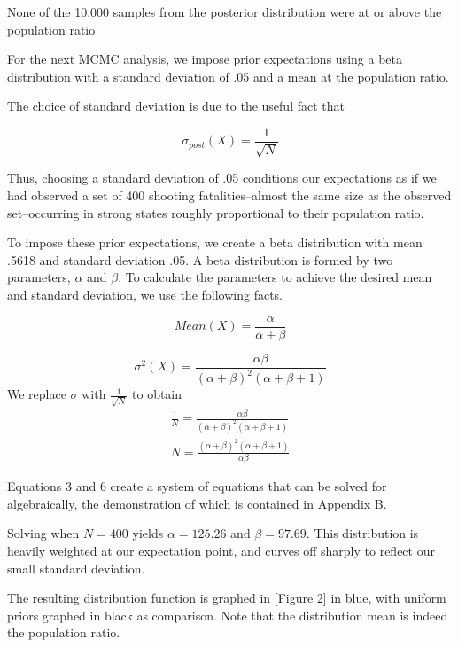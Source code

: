 \documentclass{article}
\begin{document}
None of the 10,000 samples from the posterior distribution were at or above the population ratio

For the next MCMC analysis, we impose prior expectations using a beta distribution with a standard deviation of .05 and a mean at the population ratio. 

The choice of standard deviation is due to the useful fact that

\begin{equation}
\sigma_{post}(X) = \frac{1}{\sqrt{N}}
\end{equation}

Thus, choosing a standard deviation of .05 conditions our expectations as if we had observed a set of 400 shooting fatalities--almost the same size as the observed set--occurring in strong states roughly proportional to their population ratio. 

To impose these prior expectations, we create a beta distribution with mean .5618 and standard deviation .05. A beta distribution is formed by two parameters, $\alpha $ and $\beta$. To calculate the parameters to achieve the desired mean and standard deviation, we use the following facts.

\begin{equation}
Mean(X) = \frac{\alpha}{\alpha + \beta}
\end{equation}

\begin{equation}
\sigma^2(X) = \frac{\alpha \beta}{(\alpha + \beta)^2 (\alpha + \beta +1)}
\end{equation}
We replace $\sigma$ with $\frac{1}{\sqrt{N}}$ to obtain
\begin{align}
\frac{1}{N} = \frac{\alpha \beta}{(\alpha + \beta)^2 (\alpha + \beta +1)}\\
N = \frac{(\alpha + \beta)^2 (\alpha + \beta +1)}{\alpha \beta}
\end{align}

Equations 3 and 6 create a system of equations that can be solved for algebraically, the demonstration of which is contained in Appendix B.

Solving when $N = 400$ yields $\alpha = 125.26$ and $\beta =97.69$. This distribution is heavily weighted at our expectation point, and curves off sharply to reflect our small standard deviation.

The resulting distribution function is graphed in \ref{Figure 2} in blue, with uniform priors graphed in black as comparison. Note that the distribution mean is indeed the population ratio. 
\end{document}
